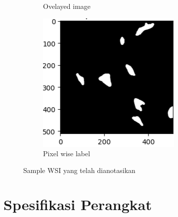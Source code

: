 \begin{figure}[H]
\begin{subfigure}[b]{0.3\textwidth}
		\caption{Ovelayed image}
		\label{fig:overlayed-image}
	\end{subfigure}
	\hfill
	\begin{subfigure}[b]{0.3\textwidth}
		\centering
		\includegraphics[width=\textwidth]{gambar/pixelwise_label.png}
		\caption{Pixel wise label}
		\label{fig:Pixel wise label}
	\end{subfigure}
	\caption{Sample WSI yang telah dianotasikan}
	\label{fig:sample_data}
\end{figure}

\section{Spesifikasi Perangkat}

